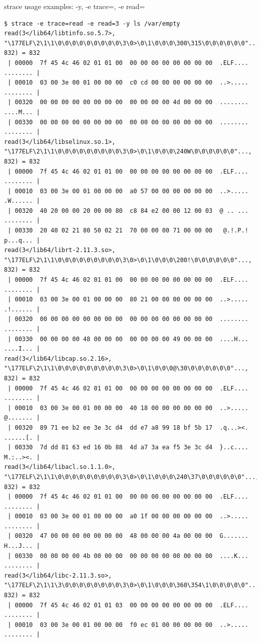 \documentclass[unicode,aspectratio=169]{beamer}
\begin{document}
\begin{frame}[fragile]{strace usage examples: -y, -e trace=, -e read=}
\Tiny
\begin{verbatim}
$ strace -e trace=read -e read=3 -y ls /var/empty
read(3</lib64/libtinfo.so.5.7>, "\177ELF\2\1\1\0\0\0\0\0\0\0\0\0\3\0>\0\1\0\0\0\300\315\0\0\0\0\0\0"..., 832) = 832
 | 00000  7f 45 4c 46 02 01 01 00  00 00 00 00 00 00 00 00  .ELF.... ........ |
 | 00010  03 00 3e 00 01 00 00 00  c0 cd 00 00 00 00 00 00  ..>..... ........ |
 | 00320  00 00 00 00 00 00 00 00  00 00 00 00 4d 00 00 00  ........ ....M... |
 | 00330  00 00 00 00 00 00 00 00  00 00 00 00 00 00 00 00  ........ ........ |
read(3</lib64/libselinux.so.1>, "\177ELF\2\1\1\0\0\0\0\0\0\0\0\0\3\0>\0\1\0\0\0\240W\0\0\0\0\0\0"..., 832) = 832
 | 00000  7f 45 4c 46 02 01 01 00  00 00 00 00 00 00 00 00  .ELF.... ........ |
 | 00010  03 00 3e 00 01 00 00 00  a0 57 00 00 00 00 00 00  ..>..... .W...... |
 | 00320  40 20 00 00 20 00 00 80  c8 84 e2 00 00 12 00 03  @ .. ... ........ |
 | 00330  20 40 02 21 80 50 02 21  70 00 00 00 71 00 00 00   @.!.P.! p...q... |
read(3</lib64/librt-2.11.3.so>, "\177ELF\2\1\1\0\0\0\0\0\0\0\0\0\3\0>\0\1\0\0\0\200!\0\0\0\0\0\0"..., 832) = 832
 | 00000  7f 45 4c 46 02 01 01 00  00 00 00 00 00 00 00 00  .ELF.... ........ |
 | 00010  03 00 3e 00 01 00 00 00  80 21 00 00 00 00 00 00  ..>..... .!...... |
 | 00320  00 00 00 00 00 00 00 00  00 00 00 00 00 00 00 00  ........ ........ |
 | 00330  00 00 00 00 48 00 00 00  00 00 00 00 49 00 00 00  ....H... ....I... |
read(3</lib64/libcap.so.2.16>, "\177ELF\2\1\1\0\0\0\0\0\0\0\0\0\3\0>\0\1\0\0\0@\30\0\0\0\0\0\0"..., 832) = 832
 | 00000  7f 45 4c 46 02 01 01 00  00 00 00 00 00 00 00 00  .ELF.... ........ |
 | 00010  03 00 3e 00 01 00 00 00  40 18 00 00 00 00 00 00  ..>..... @....... |
 | 00320  89 71 ee b2 ee 3e 3c d4  dd e7 a8 99 18 bf 5b 17  .q...><. ......[. |
 | 00330  7d dd 81 63 ed 16 0b 88  4d a7 3a ea f5 3e 3c d4  }..c.... M.:..><. |
read(3</lib64/libacl.so.1.1.0>, "\177ELF\2\1\1\0\0\0\0\0\0\0\0\0\3\0>\0\1\0\0\0\240\37\0\0\0\0\0\0"..., 832) = 832
 | 00000  7f 45 4c 46 02 01 01 00  00 00 00 00 00 00 00 00  .ELF.... ........ |
 | 00010  03 00 3e 00 01 00 00 00  a0 1f 00 00 00 00 00 00  ..>..... ........ |
 | 00320  47 00 00 00 00 00 00 00  48 00 00 00 4a 00 00 00  G....... H...J... |
 | 00330  00 00 00 00 4b 00 00 00  00 00 00 00 00 00 00 00  ....K... ........ |
read(3</lib64/libc-2.11.3.so>, "\177ELF\2\1\1\3\0\0\0\0\0\0\0\0\3\0>\0\1\0\0\0\360\354\1\0\0\0\0\0"..., 832) = 832
 | 00000  7f 45 4c 46 02 01 01 03  00 00 00 00 00 00 00 00  .ELF.... ........ |
 | 00010  03 00 3e 00 01 00 00 00  f0 ec 01 00 00 00 00 00  ..>..... ........ |

\end{verbatim}
\end{frame}
\end{document}
